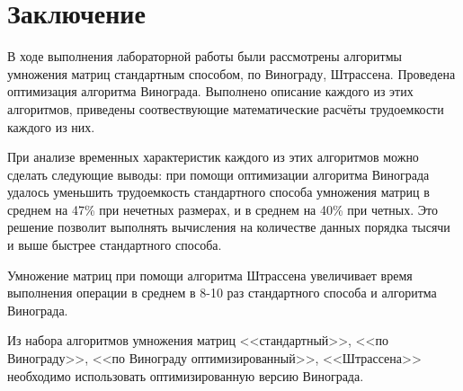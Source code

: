 \chapter*{Заключение}
В ходе выполнения лабораторной работы были рассмотрены алгоритмы умножения матриц стандартным способом, по Винограду,  Штрассена. Проведена оптимизация алгоритма Винограда. Выполнено описание каждого из этих алгоритмов, приведены соотвествующие математические расчёты трудоемкости каждого из них.

При анализе временных характеристик каждого из этих алгоритмов можно сделать следующие выводы: при помощи оптимизации алгоритма Винограда удалось уменьшить трудоемкость стандартного способа умножения матриц в среднем на 47\% при нечетных размерах, и в среднем на 40\% при четных. Это решение позволит выполнять вычисления на количестве данных порядка тысячи и выше быстрее стандартного способа. 

Умножение матриц при помощи алгоритма Штрассена увеличивает время выполнения операции в среднем в 8-10 раз стандартного способа и алгоритма Винограда. 

Из набора алгоритмов умножения матриц <<стандартный>>, <<по Винограду>>, <<по Винограду оптимизированный>>, <<Штрассена>> необходимо использовать оптимизированную версию Винограда.